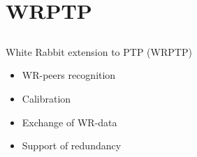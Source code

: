 \documentclass[compress,red]{beamer}
\begin{document}
\section{WRPTP}
\subsection{}
\begin{frame}{White Rabbit extension to PTP (WRPTP)}

  \begin{itemize}
    \item WR-peers recognition
    \item Calibration
    \item Exchange of WR-data
    \item Support of redundancy
  \end{itemize}

\end{frame}
\end{document}
